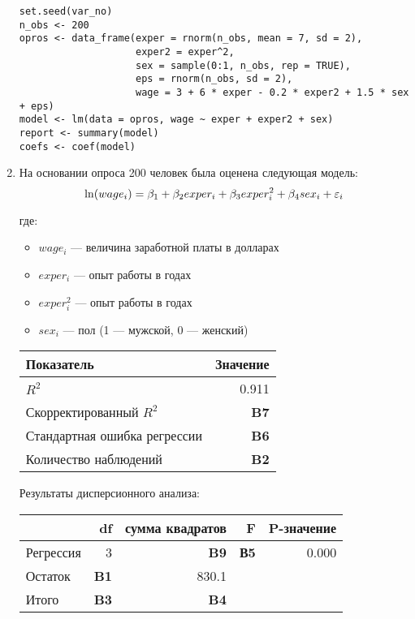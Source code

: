 \documentclass[12pt, a4paper]{article}
\theoremstyle{definition}
\begin{document}
\begin{enumerate}

\begin{verbatim}
set.seed(var_no)
n_obs <- 200
opros <- data_frame(exper = rnorm(n_obs, mean = 7, sd = 2),
                    exper2 = exper^2,
                    sex = sample(0:1, n_obs, rep = TRUE),
                    eps = rnorm(n_obs, sd = 2),
                    wage = 3 + 6 * exper - 0.2 * exper2 + 1.5 * sex + eps)
model <- lm(data = opros, wage ~ exper + exper2 + sex)
report <- summary(model)
coefs <- coef(model)
\end{verbatim}

\item На основании опроса 200 человек была оценена следующая модель:
\[
\ln(wage_i)=\beta_1 + \beta_2 exper_i + \beta_3 exper^2_i + \beta_4 sex_i + \varepsilon_i
\]

где:
\begin{itemize}
\item $wage_i$ — величина заработной платы в долларах
\item $exper_i$ — опыт работы в годах
\item $exper^2_i$ — опыт работы в годах
\item $sex_i$ — пол (1 — мужской, 0 — женский)
\end{itemize}

\begin{tabular}{lr} \toprule
Показатель & Значение \\
\midrule
$R^2$                        & 0.911 \\
Скорректированный $R^2$      & \textbf{B7} \\
Стандартная ошибка регрессии & \textbf{B6} \\
Количество наблюдений        & \textbf{B2} \\
\bottomrule
\end{tabular}

Результаты дисперсионного анализа:

\begin{tabular}{lrrrr} \toprule
            &  df           & сумма квадратов & F           & P-значение \\
\midrule
Регрессия   & 3            & \textbf{B9}     & \textbf{В5}  & 0.000 \\
Остаток     & \textbf{B1}  &  830.1          &              &       \\
Итого       & \textbf{B3}  & \textbf{B4}     &              &       \\
\bottomrule
\end{tabular}



\end{enumerate}
\end{document}
